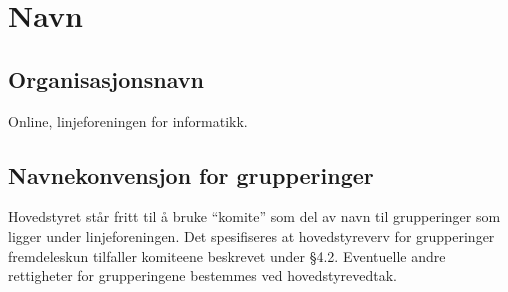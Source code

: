 \chapter{Navn}
\section{Organisasjonsnavn}{
Online, linjeforeningen for informatikk.


}


\section{Navnekonvensjon for grupperinger}

Hovedstyret står fritt til å bruke “komite” som del av navn til grupperinger som ligger under linjeforeningen. Det spesifiseres at hovedstyreverv for grupperinger fremdeles\linebreak kun tilfaller komiteene beskrevet under §4.2. Eventuelle andre rettigheter for \linebreak grupperingene bestemmes ved hovedstyrevedtak.

